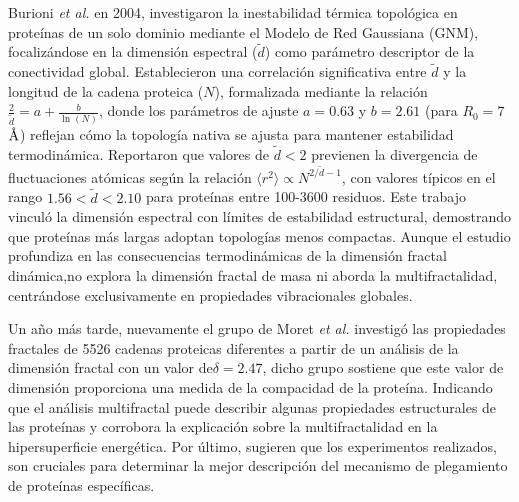 Burioni \textit{et al.} en 2004, \cite{Burioni2004} investigaron la inestabilidad térmica topológica en proteínas de un solo dominio mediante el Modelo de Red Gaussiana (GNM), focalizándose en la dimensión espectral ($\tilde{d}$) como parámetro descriptor de la conectividad global. Establecieron una correlación significativa entre $\tilde{d}$ y la longitud de la cadena proteica ($N$), formalizada mediante la relación $\frac{2}{\tilde{d}} = a + \frac{b}{\ln(N)}$, donde los parámetros de ajuste $a = 0.63$ y $b = 2.61$ (para $R_0 = 7$ $\textup{\r{A}}$) reflejan cómo la topología nativa se ajusta para mantener estabilidad termodinámica. Reportaron que valores de $\tilde{d} < 2$ previenen la divergencia de fluctuaciones atómicas según la relación $\langle r^2 \rangle \propto N^{2/\tilde{d}-1}$, con valores típicos en el rango $1.56 < \tilde{d} < 2.10$ para proteínas entre 100-3600 residuos. Este trabajo vinculó la dimensión espectral con límites de estabilidad estructural, demostrando que proteínas más largas adoptan topologías menos compactas. Aunque el estudio profundiza en las consecuencias termodinámicas de la dimensión fractal dinámica,no explora la dimensión fractal de masa ni aborda la multifractalidad, centrándose exclusivamente en propiedades vibracionales globales.

Un año m\'{a}s tarde, nuevamente el grupo de Moret \textit{et al.} \cite{Moret2005} investig\'{o} las propiedades fractales de 5526 cadenas proteicas diferentes a partir de un an\'{a}lisis de la dimensi\'{o}n fractal con un valor de$\delta = 2.47$, dicho grupo sostiene que este valor de dimensi\'{o}n proporciona una medida de la compacidad de la prote\'{i}na. Indicando que el an\'{a}lisis multifractal puede describir algunas propiedades estructurales de las prote\'{i}nas y corrobora la explicaci\'{o}n sobre la multifractalidad en la hipersuperficie energ\'{e}tica. Por \'{u}ltimo, sugieren que los experimentos realizados, son cruciales para determinar la mejor descripci\'{o}n del mecanismo de plegamiento de prote\'{i}nas espec\'{i}ficas.

